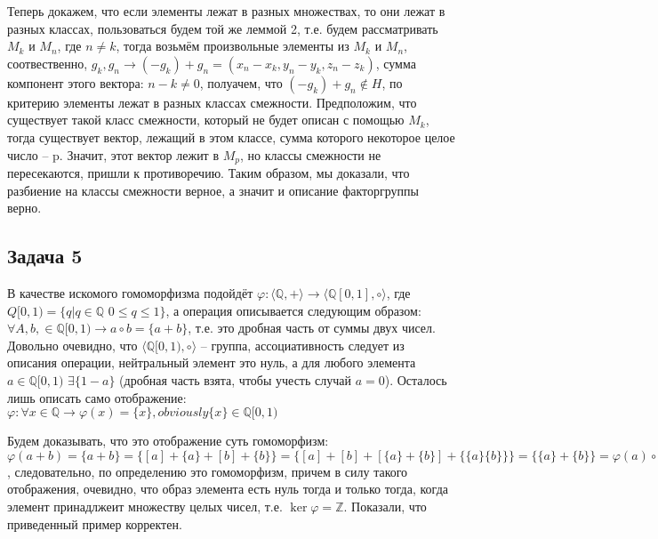 \documentclass[a4paper,14pt]{article} %
\begin{document}
Теперь докажем, что если элементы лежат в разных множествах, то они лежат в разных классах, пользоваться будем той же леммой 2, т.е. будем рассматривать $M_k$ и $M_n$, где $n \not = k$, тогда возьмём произвольные элементы из $M_k$ и $M_n$, соотвественно, $g_k, g_n \rightarrow (-g_k) + g_n = (x_n - x_k, y_n - y_k, z_n - z_k)$, 
сумма компонент этого вектора: $n - k \not = 0$, полуачем, что $(-g_k) + g_n \not \in H$, по критерию элементы лежат в разных классах смежности. Предположим, что существует такой класс смежности, который не будет описан с помощью $M_k$, тогда существует вектор, лежащий в этом классе, сумма которого некоторое целое число -- p.
Значит, этот вектор лежит в $M_p$, но классы смежности не пересекаются, пришли к противоречию. Таким образом, мы доказали, что разбиение на классы смежности верное, а значит и описание факторгруппы верно.

\subsection{Задача 5}
В качестве искомого гомоморфизма подойдёт $\varphi : \langle \mathds{Q}, + \rangle \rightarrow \langle \mathds{Q}[0, 1], \circ \rangle $, где $Q[0, 1) = \{ q | q \in \mathds{Q}$  $0 \leq q \leq 1 \}$, а операция описывается следующим образом:
$\forall A, b, \in \mathds{Q}[0, 1) \rightarrow a \circ b = \{ a + b\}$, т.е. это дробная часть от суммы двух чисел. Довольно очевидно, что $\langle \mathds{Q}[0, 1), \circ \rangle$ -- группа, ассоциативность следует из описания операции, нейтральный элемент это нуль, а 
для любого элемента $a \in \mathds{Q}[0, 1)$ $\exists \{ 1 - a\}$ (дробная часть взята, чтобы учесть случай $a = 0$). 
Осталось лишь описать само отображение:
\newline
 $\varphi : \forall x \in \mathds{Q} \rightarrow \varphi(x) = \{ x \}, obviously \{ x \} \in \mathds{Q}[0, 1)$
 
 Будем доказывать, что это отображение суть гомоморфизм: $\varphi (a + b) = \{ a + b \} = \{ [a] + \{ a \} + [b] + \{b \} \} = \{ [a] +[b] + [\{a \} + \{b \}] + \{ \{ a\} \{b\} \} \} = \{\{a\} + \{ b \} \} = \varphi(a) \circ \varphi(b)$, 
 следовательно, по определению это гомоморфизм, причем в силу такого отображения, очевидно, что образ элемента есть нуль тогда и только тогда, когда элемент принадлжеит множеству целых чисел, т.е. $\ker \varphi = \mathds{Z}$. Показали, что приведенный пример корректен.
\end{document}
